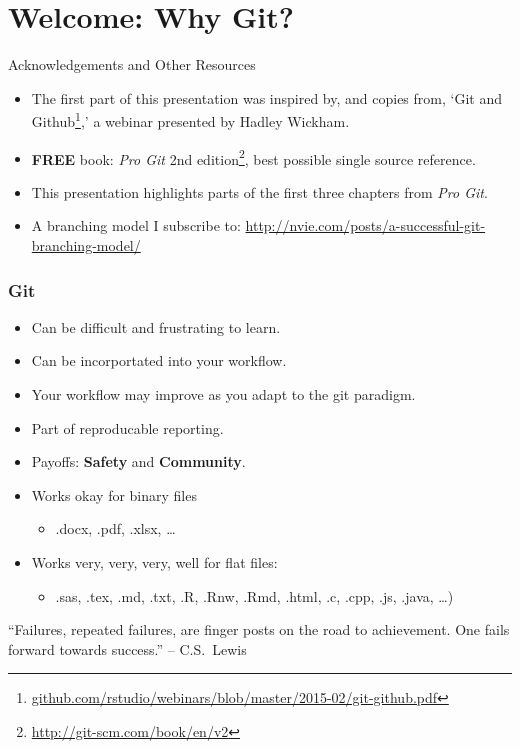   \section{Welcome: Why Git?}
  \begin{frame}[t]{Acknowledgements and Other Resources}
    \begin{itemize}
      \item The first part of this presentation was inspired by, and copies
        from, `Git and
        Github\footnote{\url{github.com/rstudio/webinars/blob/master/2015-02/git-github.pdf}},' a webinar presented by Hadley Wickham.
      \item {\bf FREE} book: {\it Pro Git} 2nd
        edition\footnote{\url{http://git-scm.com/book/en/v2}}, best possible
        single source reference.
      \item This presentation highlights parts of the first three chapters from
        {\it Pro Git}.
      \item A branching model I subscribe to:
        \url{http://nvie.com/posts/a-successful-git-branching-model/}
    \end{itemize} 
  \end{frame}

  \begin{frame}[t]
    \frametitle{Git}
    \begin{itemize}
      \item Can be difficult and frustrating to learn.
      \item Can be incorportated into your workflow.
      \item Your workflow may improve as you adapt to the git paradigm.
      \item Part of reproducable reporting.
      \item Payoffs: {\bf Safety} and {\bf Community}.
      \item Works okay for binary files 
        \begin{itemize} \item .docx, .pdf, .xlsx, \ldots \end{itemize}
      \item Works very, very, very, well for flat files: 
        \begin{itemize} \item .sas, .tex, .md, .txt, .R, .Rnw, .Rmd, .html, .c,
          .cpp, .js, .java, \ldots) \end{itemize}
        
    \end{itemize}
    ``Failures, repeated failures, are finger posts on the road to achievement.
    One fails forward towards success.'' -- C.S.\ Lewis
  \end{frame}


